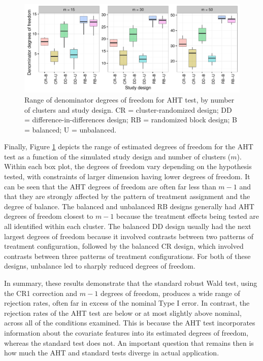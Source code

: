 \documentclass[12pt]{article}\usepackage[]{graphicx}\usepackage[]{color}
\newenvironment{knitrout}{}{} %
\begin{document}
\begin{knitrout}
\color{fgcolor}\begin{figure}

{\centering \includegraphics[width=\linewidth]{CR_fig/df-1} 

}

\caption[Range of denominator degrees of freedom for AHT test, by number of clusters and study design]{Range of denominator degrees of freedom for AHT test, by number of clusters and study design. CR = cluster-randomized design; DD = difference-in-differences design; RB = randomized block design; B = balanced; U = unbalanced.}\label{fig:df}
\end{figure}


\end{knitrout}

Finally, Figure \ref{fig:df} depicts the range of estimated degrees of freedom for the AHT test as a function of the simulated study design and number of clusters ($m$). 
Within each box plot, the degrees of freedom vary depending on the hypothesis tested, with constraints of larger dimension having lower degrees of freedom. 
It can be seen that the AHT degrees of freedom are often far less than $m - 1$ and that they are strongly affected by the pattern of treatment assignment and the degree of balance. The balanced and unbalanced RB designs generally had AHT degrees of freedom closest to $m - 1$ because the treatment effects being tested are all identified within each cluster. 
The balanced DD design usually had the next largest degrees of freedom because it involved contrasts between two patterns of treatment configuration, followed by the balanced CR design, which involved contrasts between three patterns of treatment configurations. 
For both of these designs, unbalance led to sharply reduced degrees of freedom.

In summary, these results demonstrate that the standard robust Wald test, using the CR1 correction and $m - 1$ degrees of freedom, produces a wide range of rejection rates, often far in excess of the nominal Type I error. 
In contrast, the rejection rates of the AHT test are below or at most slightly above nominal, across all of the conditions examined.
This is because the AHT test incorporates information about the covariate features into its estimated degrees of freedom, whereas the standard test does not.
An important question that remains then is how much the AHT and standard tests diverge in actual application.
\end{document}

